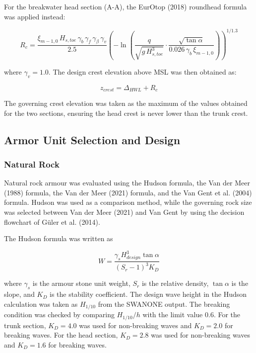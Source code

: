 \documentclass[a4paper, 11pt]{article}
\begin{document}
For the breakwater head section (A-A), the EurOtop (2018) 
roundhead formula was applied instead:

\begin{equation}
    R_c = \frac{\xi_{m-1,0}\,H_{s,toe}\,\gamma_b\,\gamma_f\,
    \gamma_\beta\,\gamma_v}{2.5}
    \left(-\ln\left(\frac{q}{\sqrt{g\,H_{s,toe}^3}}\cdot
    \frac{\sqrt{\tan\alpha}}{0.026\,\gamma_b\,
    \xi_{m-1,0}}\right)\right)^{1/1.3}
\end{equation}

where $\gamma_v = 1.0$. The design crest elevation above MSL was 
then obtained as:

\begin{equation}
    z_{crest} = \Delta_{HWL} + R_c
\end{equation}

The governing crest elevation was taken as the maximum of the 
values obtained for the two sections, ensuring the head crest 
is never lower than the trunk crest.

\subsection{Armor Unit Selection and Design}
\subsubsection{Natural Rock}
\hspace{0.5cm}Natural rock armour was evaluated using the Hudson formula, the Van der Meer (1988) formula, the Van der Meer (2021) formula, and the Van Gent et al. (2004) formula. Hudson was used as a comparison method, while the governing rock size was selected between Van der Meer (2021) and Van Gent by using the decision flowchart of G\"uler et al. (2014).

The Hudson formula was written as

\begin{equation}
    W=\frac{\gamma_s H_{design}^3 \tan\alpha}{(S_r-1)^3 K_D}
\end{equation}

where $\gamma_s$ is the armour stone unit weight, $S_r$ is the relative density, $\tan\alpha$ is the slope, and $K_D$ is the stability coefficient. The design wave height in the Hudson calculation was taken as $H_{1/10}$ from the SWANONE output. The breaking condition was checked by comparing $H_{1/10}/h$ with the limit value 0.6. For the trunk section, $K_D=4.0$ was used for non-breaking waves and $K_D=2.0$ for breaking waves. For the head section, $K_D=2.8$ was used for non-breaking waves and $K_D=1.6$ for breaking waves.
\end{document}
